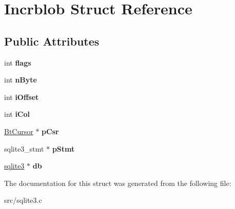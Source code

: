 \hypertarget{struct_incrblob}{\section{Incrblob Struct Reference}
\label{struct_incrblob}
}
\subsection*{Public Attributes}
\begin{DoxyCompactItemize}
\item 
\hypertarget{struct_incrblob_a46fa093e5241305f28d02926f8d0846f}{int {\bfseries flags}}\label{struct_incrblob_a46fa093e5241305f28d02926f8d0846f}

\item 
\hypertarget{struct_incrblob_ab1e1439df086208173fa97003f0ee02b}{int {\bfseries n\-Byte}}\label{struct_incrblob_ab1e1439df086208173fa97003f0ee02b}

\item 
\hypertarget{struct_incrblob_af8e71744f43178967460b9f402e7fafd}{int {\bfseries i\-Offset}}\label{struct_incrblob_af8e71744f43178967460b9f402e7fafd}

\item 
\hypertarget{struct_incrblob_a398a322b061fb9952bc155026976ba51}{int {\bfseries i\-Col}}\label{struct_incrblob_a398a322b061fb9952bc155026976ba51}

\item 
\hypertarget{struct_incrblob_af5a24b18473d1449c8c3fe7d826de59a}{\hyperlink{struct_bt_cursor}{Bt\-Cursor} $\ast$ {\bfseries p\-Csr}}\label{struct_incrblob_af5a24b18473d1449c8c3fe7d826de59a}

\item 
\hypertarget{struct_incrblob_a8b7b39c9372db552add74c69f14a61a3}{sqlite3\-\_\-stmt $\ast$ {\bfseries p\-Stmt}}\label{struct_incrblob_a8b7b39c9372db552add74c69f14a61a3}

\item 
\hypertarget{struct_incrblob_a9d3fe0b0229b75b9d0f9ee8e6545b5bc}{\hyperlink{structsqlite3}{sqlite3} $\ast$ {\bfseries db}}\label{struct_incrblob_a9d3fe0b0229b75b9d0f9ee8e6545b5bc}

\end{DoxyCompactItemize}


The documentation for this struct was generated from the following file\-:\begin{DoxyCompactItemize}
\item 
src/sqlite3.\-c\end{DoxyCompactItemize}
